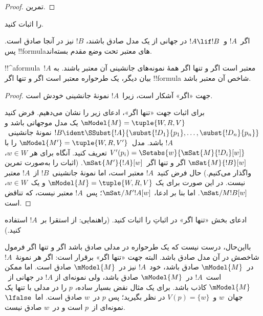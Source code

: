 \documentclass[../../../include/open-logic-section]{subfiles}
\begin{document}
\begin{proof}
  تمرین.
\end{proof}

\begin{prob}
   را اثبات کنید.
\end{prob}

\begin{prop}
  اگر~$!A$ و~$!A \lif !B$ در جهانی از یک مدل صادق باشند، $!B$ نیز در
  آنجا صادق است. پس !!{formula}های معتبر تحت وضع مقدم بسته‌اند.
\end{prop}

\begin{prop}
  !!^a{formula}~$!A$ معتبر است اگر و تنها اگر همهٔ نمونه‌های جانشینی آن
  معتبر باشند. به بیان دیگر، یک طرحواره معتبر است اگر و تنها اگر
  !!{formula} شاخص آن معتبر باشد.
\end{prop}

\begin{proof}
  جهت «اگر» آشکار است، زیرا~$!A$ نمونهٔ جانشینی خودش است.

  برای اثبات جهت «تنها اگر»، ادعای زیر را نشان می‌دهیم. فرض کنید
  $\mModel{M} = \tuple{W, R, V}$ یک مدل موجهاتی باشد و
  $!B \ident \SSubst{!A}{\subst{!D_1}{p_1},\dots,\subst{!D_n}{p_n}}$
  نمونهٔ جانشینی~$!A$ باشد. مدل~$\mModel{M'} = \tuple{W, R,V'}$ را با
  $V'(p_i) = \Setabs{w}{\mSat{M}{!D_i}[w]}$ تعریف کنید. آنگاه برای هر
  $w \in W$، $\mSat{M}{!B}[w]$ اگر و تنها اگر~$\mSat{M'}{!A}[w]$.
  (اثبات را به‌صورت تمرین واگذار می‌کنیم.) حال فرض کنید~$!A$ معتبر است،
  اما نمونهٔ جانشینی~$!B$ از~$!A$ معتبر نیست. در این صورت برای یک
  $\mModel{M} = \tuple{W, R, V}$ و یک~$w \in W$،
  $\mSat/{M}{!B}[w]$. اما بنا بر ادعا، $\mSat/{M'}{!A}[w]$؛ پس~$!A$
  معتبر نیست، که تناقض است.
\end{proof}

\begin{prob}
  ادعای بخش «تنها اگر» در اثباتِ
   را اثبات کنید. (راهنمایی:
  از استقرا بر~$!A$ استفاده کنید.)
\end{prob}

بااین‌حال، درست نیست که یک طرحواره در مدلی صادق باشد اگر و تنها اگر
فرمول شاخصش در آن مدل صادق باشد. البته جهت «تنها اگر» برقرار است: اگر
هر نمونهٔ~$!A$ در~$\mModel{M}$ صادق باشد، خود~$!A$ نیز در~$\mModel{M}$
صادق است. اما ممکن است~$!A$ در~$\mModel{M}$ صادق باشد، ولی نمونه‌ای از
$!A$ در جهانی از~$\mModel{M}$ کاذب باشد. برای یک مثال نقض بسیار ساده،
$p$ را در مدلی با تنها یک جهان~$w$ و~$V(p) = \{w\}$ در نظر بگیرید؛ پس
$p$ در~$w$ صادق است. اما~$\lfalse$ نمونه‌ای از~$p$ است و در~$w$ صادق
نیست.
\end{document}
